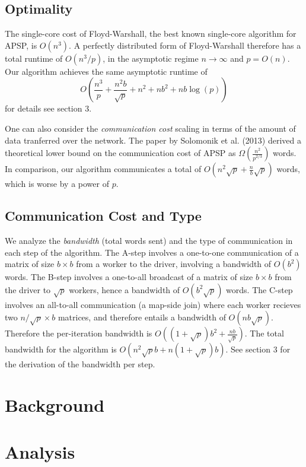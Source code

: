 \documentclass{article} %
\begin{document}
\subsection{Optimality}

The single-core cost of Floyd-Warshall, the best known single-core
algorithm for APSP, is $O(n^3)$.  A perfectly distributed form of
Floyd-Warshall therefore has a total runtime of $O(n^3/p)$, in the
asymptotic regime $n \to \infty$ and $p = O(n)$.  Our algorithm
achieves the same asymptotic runtime of
\[
O\left(\frac{n^3}{p} + \frac{n^2b}{\sqrt{p}} + n^2 + nb^2 + nb\log(p)\right)
\]
for details see section 3.

One can also consider the \emph{communication cost} scaling in terms
of the amount of data tranferred over the network.  The paper by
Solomonik et al. (2013) derived a theoretical lower bound on the
communication cost of APSP as $\Omega(\frac{n^2}{p^{2/3}})$ words.  In
comparison, our algorithm communicates a total of $O(n^2\sqrt{p} + \frac{n}{b}\sqrt{p})$
words, which is worse by a power of $p$.

\subsection{Communication Cost and Type}

We analyze the \emph{bandwidth} (total words sent) and the type of
communication in each step of the algorithm.  The A-step involves a
one-to-one communication of a matrix of size $b \times b$ from a
worker to the driver, involving a bandwidth of $O(b^2)$ words.  The
B-step involves a one-to-all broadcast of a matrix of size $b\times b$
from the driver to $\sqrt{p}$ workers, hence a bandwidth of $O(b^2
\sqrt{p})$ words.  The C-step involves an all-to-all communication (a
map-side join) where each worker recieves two $n/\sqrt{p} \times b$
matrices, and therefore entails a bandwidth of $O(nb\sqrt{p})$.
Therefore the per-iteration bandwidth is $O((1 + \sqrt{p})b^2 +
\frac{nb}{\sqrt{p}})$.  The total bandwidth for the algorithm is
$O(n^2\sqrt{p}b + n(1+\sqrt{p})b)$.  See section 3 for the derivation
of the bandwidth per step.

\section{Background}

\section{Analysis}
\end{document}
